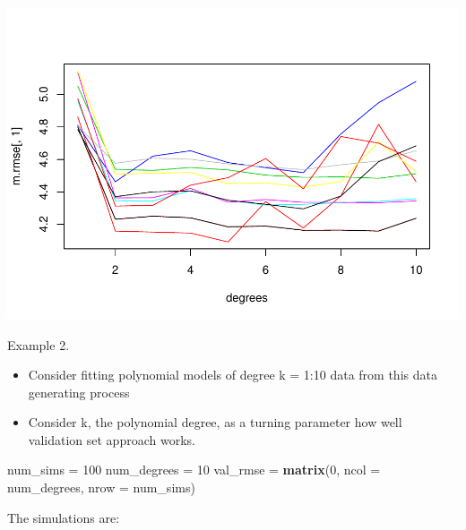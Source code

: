 \documentclass[]{report}
\newenvironment{Shaded}{\begin{snugshade}}{\end{snugshade}}
\newcommand{\KeywordTok}[1]{\textcolor[rgb]{0.13,0.29,0.53}{\textbf{#1}}}
\newcommand{\DataTypeTok}[1]{\textcolor[rgb]{0.13,0.29,0.53}{#1}}
\newcommand{\DecValTok}[1]{\textcolor[rgb]{0.00,0.00,0.81}{#1}}
\newcommand{\StringTok}[1]{\textcolor[rgb]{0.31,0.60,0.02}{#1}}
\newcommand{\NormalTok}[1]{#1}
\providecommand{\tightlist}{%
  \setlength{\itemsep}{0pt}\setlength{\parskip}{0pt}}
\begin{document}
\includegraphics{MyBook_files/figure-latex/unnamed-chunk-136-1.pdf}

Example 2.

\begin{itemize}
\tightlist
\item
  Consider fitting polynomial models of degree k = 1:10 data from this
  data generating process
\item
  Consider k, the polynomial degree, as a turning parameter how well
  validation set approach works.
\end{itemize}

\begin{Shaded}
\begin{Highlighting}[]
\NormalTok{num_sims =}\StringTok{ }\DecValTok{100}
\NormalTok{num_degrees =}\StringTok{ }\DecValTok{10}
\NormalTok{val_rmse =}\StringTok{ }\KeywordTok{matrix}\NormalTok{(}\DecValTok{0}\NormalTok{, }\DataTypeTok{ncol =}\NormalTok{ num_degrees, }\DataTypeTok{nrow =}\NormalTok{ num_sims)}
\end{Highlighting}
\end{Shaded}

The simulations are:
\end{document}
